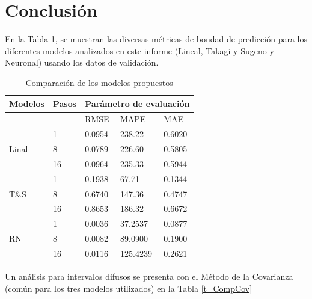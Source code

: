 \documentclass[12pt]{article}
\begin{document}
\newpage
\section{Conclusión}

En la Tabla \ref{t_Comp}, se muestran las diversas métricas de bondad de predicción para los diferentes modelos analizados en este informe (Lineal, Takagi y Sugeno y Neuronal) usando los datos de validación.

\begin{table}[htbp]
  \centering
  \caption{Comparación de los modelos propuestos}
\begin{tabular}{|l|l|l|l|l|}
	\hline
	Modelos                & Pasos & \multicolumn{3}{l|}{Parámetro de evaluación} \\ \hline
	\multicolumn{2}{|l|}{}         & RMSE         & MAPE           & MAE          \\ \hline
	\multirow{3}{*}{Linal} & 1     & 0.0954       & 238.22         & 0.6020       \\ \cline{2-5} 
	& 8     & 0.0789       & 226.60         & 0.5805       \\ \cline{2-5} 
	& 16    & 0.0964       & 235.33         & 0.5944       \\ \hline
	\multirow{3}{*}{T\&S}  & 1     & 0.1938       & 67.71          & 0.1344       \\ \cline{2-5} 
	& 8     & 0.6740       & 147.36         & 0.4747       \\ \cline{2-5} 
	& 16    & 0.8653       & 186.32         & 0.6672       \\ \hline
	\multirow{3}{*}{RN}    & 1     & 0.0036       & 37.2537        & 0.0877       \\ \cline{2-5} 
	& 8     & 0.0082       & 89.0900        & 0.1900       \\ \cline{2-5} 
	& 16    & 0.0116       & 125.4239       & 0.2621       \\ \hline
\end{tabular}
  \label{t_Comp}%
\end{table}%

Un análisis para intervalos difusos se presenta con el Método de la Covarianza (común para los tres modelos utilizados) en la  Tabla \ref{t_CompCov}
\end{document}
